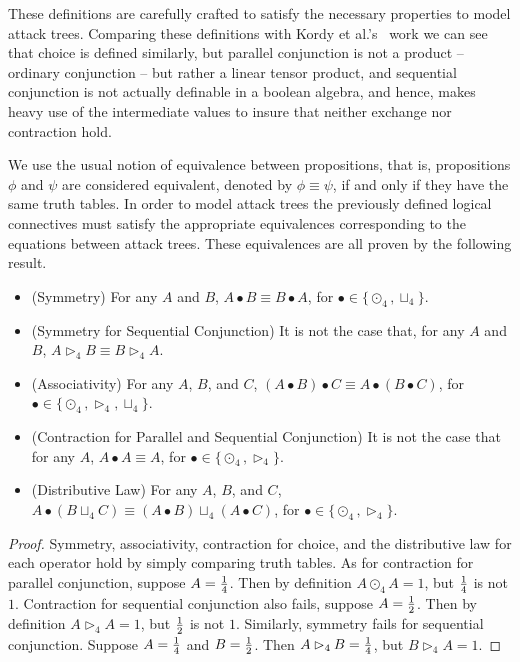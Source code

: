 These definitions are carefully crafted to satisfy the necessary
properties to model attack trees.  Comparing these definitions with
Kordy et al.'s~\cite{Kordy:2012} work we can see that choice is
defined similarly, but parallel conjunction is not a product --
ordinary conjunction -- but rather a linear tensor product, and
sequential conjunction is not actually definable in a boolean algebra,
and hence, makes heavy use of the intermediate values to insure that
neither exchange nor contraction hold.  

We use the usual notion of equivalence between propositions, that is,
propositions $\phi$ and $\psi$ are considered equivalent, denoted by
$\phi \equiv \psi$, if and only if they have the same truth tables. In
order to model attack trees the previously defined logical connectives
must satisfy the appropriate equivalences corresponding to the
equations between attack trees.  These equivalences are all proven by
the following result.
\begin{lemma}
  \label{lemma:props_atree_ops_quaternary-semantics}
  \begin{itemize}
  \item[] (Symmetry) For any $A$ and $B$, $A \bullet B \equiv B \bullet A$, for $\bullet \in \{\odot_4, \sqcup_4\}$.\\[-5px]
  \item[] (Symmetry for Sequential Conjunction) It is not the case that, for any $A$ and $B$, $A \rhd_4 B \equiv B \rhd_4 A$.\\[-5px]
  \item[] (Associativity) For any $A$, $B$, and $C$, $(A \bullet B) \bullet C \equiv A \bullet (B \bullet C)$, for $\bullet \in \{\odot_4, \rhd_4, \sqcup_4\}$.\\[-5px]
  \item[] (Contraction for Parallel and Sequential Conjunction) It is not the case that for any $A$, $A \bullet A \equiv A$, for $\bullet \in \{\odot_4, \rhd_4\}$.\\[-5px]
  \item[] (Distributive Law) For any $A$, $B$, and $C$, $A \bullet (B \sqcup_4 C) \equiv (A \bullet B) \sqcup_4 (A \bullet C)$, for $\bullet \in \{\odot_4, \rhd_4\}$.\\[-5px]
  \end{itemize}
\end{lemma}
\begin{proof}
  Symmetry, associativity, contraction for choice, and the
  distributive law for each operator hold by simply comparing truth
  tables.  As for contraction for parallel conjunction, suppose $A =
  \frac{1}{4}$.  Then by definition $A \odot_4 A = 1$, but $\frac{1}{4}$ is not
  $1$.  Contraction for sequential conjunction also fails, suppose $A
  = \frac{1}{2}$.  Then by definition $A \rhd_4 A = 1$, but $\frac{1}{2}$ is not
  $1$.  Similarly, symmetry fails for sequential conjunction. Suppose
  $A = \frac{1}{4}$ and $B = \frac{1}{2}$.  Then $A \rhd_4 B = \frac{1}{4}$, but $B
  \rhd_4 A = 1$.
\end{proof}

